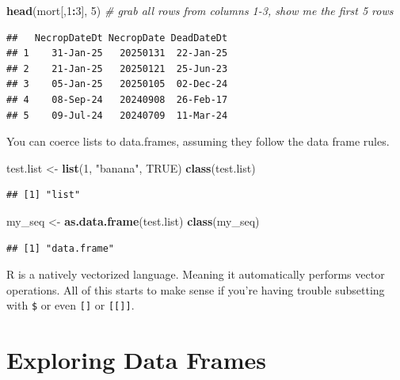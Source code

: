 \documentclass[
]{book}
\newenvironment{Shaded}{\begin{snugshade}}{\end{snugshade}}
\newcommand{\CommentTok}[1]{\textcolor[rgb]{0.56,0.35,0.01}{\textit{#1}}}
\newcommand{\ConstantTok}[1]{\textcolor[rgb]{0.56,0.35,0.01}{#1}}
\newcommand{\DecValTok}[1]{\textcolor[rgb]{0.00,0.00,0.81}{#1}}
\newcommand{\FunctionTok}[1]{\textcolor[rgb]{0.13,0.29,0.53}{\textbf{#1}}}
\newcommand{\NormalTok}[1]{#1}
\newcommand{\OtherTok}[1]{\textcolor[rgb]{0.56,0.35,0.01}{#1}}
\newcommand{\SpecialCharTok}[1]{\textcolor[rgb]{0.81,0.36,0.00}{\textbf{#1}}}
\newcommand{\StringTok}[1]{\textcolor[rgb]{0.31,0.60,0.02}{#1}}
\begin{document}
\begin{Shaded}
\begin{Highlighting}[]
\FunctionTok{head}\NormalTok{(mort[,}\DecValTok{1}\SpecialCharTok{:}\DecValTok{3}\NormalTok{], }\DecValTok{5}\NormalTok{) }\CommentTok{\# grab all rows from columns 1{-}3, show me the first 5 rows}
\end{Highlighting}
\end{Shaded}

\begin{verbatim}
##   NecropDateDt NecropDate DeadDateDt
## 1    31-Jan-25   20250131  22-Jan-25
## 2    21-Jan-25   20250121  25-Jun-23
## 3    05-Jan-25   20250105  02-Dec-24
## 4    08-Sep-24   20240908  26-Feb-17
## 5    09-Jul-24   20240709  11-Mar-24
\end{verbatim}

You can coerce lists to data.frames, assuming they follow the data frame rules.

\begin{Shaded}
\begin{Highlighting}[]
\NormalTok{test.list }\OtherTok{\textless{}{-}} \FunctionTok{list}\NormalTok{(}\DecValTok{1}\NormalTok{, }\StringTok{"banana"}\NormalTok{, }\ConstantTok{TRUE}\NormalTok{)}
\FunctionTok{class}\NormalTok{(test.list)}
\end{Highlighting}
\end{Shaded}

\begin{verbatim}
## [1] "list"
\end{verbatim}

\begin{Shaded}
\begin{Highlighting}[]
\NormalTok{my\_seq }\OtherTok{\textless{}{-}} \FunctionTok{as.data.frame}\NormalTok{(test.list)}
\FunctionTok{class}\NormalTok{(my\_seq)}
\end{Highlighting}
\end{Shaded}

\begin{verbatim}
## [1] "data.frame"
\end{verbatim}

R is a natively vectorized language. Meaning it automatically performs
vector operations. All of this starts to make sense if you're having trouble
subsetting with \texttt{\$} or even \texttt{{[}{]}} or \texttt{{[}{[}{]}{]}}.

\chapter{Exploring Data Frames}\label{exploring-data-frames}
\end{document}
